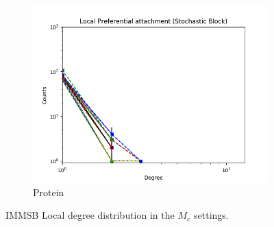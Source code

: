 \begin{figure}[h]
\begin{subfigure}[b]{0.300\textwidth}
            \includegraphics[width=\textwidth]{img/corpus/immsb_protein_1}
            \caption {{\small Protein}}    
            \label{fig:mean and std of net14}
        \end{subfigure}
        \caption{IMMSB Local degree distribution in the $M_e$ settings. } 
        \label{fig:me_fit_lburst_mmsb}
\end{figure}
